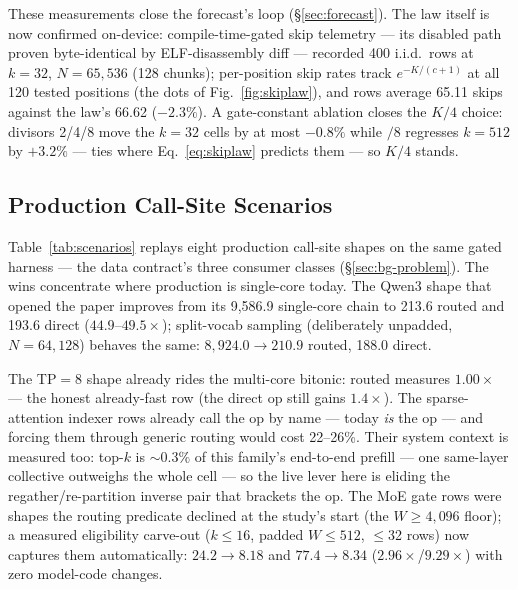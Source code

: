 These measurements close the forecast's loop (\S\ref{sec:forecast}).
The law itself is now confirmed on-device: compile-time-gated skip
telemetry --- its disabled path proven byte-identical by
ELF-disassembly diff --- recorded 400 i.i.d.\ rows at
$k{=}32$, $N{=}65{,}536$ (128 chunks); per-position skip rates track
$e^{-K/(c+1)}$ at all 120 tested positions (the dots of
Fig.~\ref{fig:skiplaw}), and rows average 65.11 skips against the
law's 66.62 ($-2.3\%$). A
gate-constant ablation closes the $K/4$ choice: divisors
2/4/8 move the $k{=}32$ cells by at most $-0.8\%$ while $/8$ regresses
$k{=}512$ by $+3.2\%$ --- ties where Eq.~\ref{eq:skiplaw}
predicts them --- so $K/4$ stands.

\subsection{Production Call-Site Scenarios}
\label{sec:eval-scenarios}

Table~\ref{tab:scenarios} replays eight production call-site shapes on
the same gated harness --- the data contract's three consumer classes
(\S\ref{sec:bg-problem}). The wins concentrate
where production is single-core today. The Qwen3 shape that opened the
paper improves from its 9,586.9\us{}
single-core chain to 213.6\us{} routed and 193.6\us{} direct
($44.9$--$49.5\times$); split-vocab sampling (deliberately
unpadded, $N{=}64{,}128$) behaves the same:
$8{,}924.0 \to 210.9$\us{} routed, 188.0\us{} direct.

The TP${=}8$
shape already rides the multi-core bitonic:
routed measures $1.00\times$ --- the honest already-fast row (the
direct op still gains $1.4\times$). The sparse-attention indexer rows
already call the op by name --- today \emph{is} the op --- and forcing
them through generic routing
would cost 22--26\%.
Their system context is measured too: top-$k$ is ${\sim}0.3\%$ of this
family's end-to-end prefill --- one same-layer collective outweighs the
whole cell --- so the live lever here is eliding the
regather/re-partition inverse pair that brackets the op.
The MoE gate rows were shapes the routing
predicate declined at the study's start (the $W \geq 4{,}096$ floor);
a measured eligibility carve-out ($k \leq 16$, padded $W \leq 512$,
$\leq$32 rows) now captures them automatically: $24.2 \to 8.18$\us{}
and $77.4 \to 8.34$\us{} ($2.96\times$/$9.29\times$) with zero
model-code changes.

